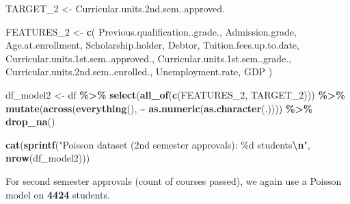 \documentclass[
]{article}
\newenvironment{Shaded}{\begin{snugshade}}{\end{snugshade}}
\newcommand{\FunctionTok}[1]{\textcolor[rgb]{0.13,0.29,0.53}{\textbf{#1}}}
\newcommand{\NormalTok}[1]{#1}
\newcommand{\OtherTok}[1]{\textcolor[rgb]{0.56,0.35,0.01}{#1}}
\newcommand{\SpecialCharTok}[1]{\textcolor[rgb]{0.81,0.36,0.00}{\textbf{#1}}}
\newcommand{\StringTok}[1]{\textcolor[rgb]{0.31,0.60,0.02}{#1}}
\begin{document}
\begin{Shaded}
\begin{Highlighting}[]
\NormalTok{TARGET\_2 }\OtherTok{\textless{}{-}} \StringTok{\textquotesingle{}Curricular.units.2nd.sem..approved.\textquotesingle{}}

\NormalTok{FEATURES\_2 }\OtherTok{\textless{}{-}} \FunctionTok{c}\NormalTok{(}
    \StringTok{\textquotesingle{}Previous.qualification..grade.\textquotesingle{}}\NormalTok{,}
    \StringTok{\textquotesingle{}Admission.grade\textquotesingle{}}\NormalTok{,}
    \StringTok{\textquotesingle{}Age.at.enrollment\textquotesingle{}}\NormalTok{,}
    \StringTok{\textquotesingle{}Scholarship.holder\textquotesingle{}}\NormalTok{,}
    \StringTok{\textquotesingle{}Debtor\textquotesingle{}}\NormalTok{,}
    \StringTok{\textquotesingle{}Tuition.fees.up.to.date\textquotesingle{}}\NormalTok{,}
    \StringTok{\textquotesingle{}Curricular.units.1st.sem..approved.\textquotesingle{}}\NormalTok{,}
    \StringTok{\textquotesingle{}Curricular.units.1st.sem..grade.\textquotesingle{}}\NormalTok{,}
    \StringTok{\textquotesingle{}Curricular.units.2nd.sem..enrolled.\textquotesingle{}}\NormalTok{,}
    \StringTok{\textquotesingle{}Unemployment.rate\textquotesingle{}}\NormalTok{,}
    \StringTok{\textquotesingle{}GDP\textquotesingle{}}
\NormalTok{)}

\NormalTok{df\_model2 }\OtherTok{\textless{}{-}}\NormalTok{ df }\SpecialCharTok{\%\textgreater{}\%}
    \FunctionTok{select}\NormalTok{(}\FunctionTok{all\_of}\NormalTok{(}\FunctionTok{c}\NormalTok{(FEATURES\_2, TARGET\_2))) }\SpecialCharTok{\%\textgreater{}\%}
    \FunctionTok{mutate}\NormalTok{(}\FunctionTok{across}\NormalTok{(}\FunctionTok{everything}\NormalTok{(), }\SpecialCharTok{\textasciitilde{}} \FunctionTok{as.numeric}\NormalTok{(}\FunctionTok{as.character}\NormalTok{(.)))) }\SpecialCharTok{\%\textgreater{}\%}
    \FunctionTok{drop\_na}\NormalTok{()}

\FunctionTok{cat}\NormalTok{(}\FunctionTok{sprintf}\NormalTok{(}\StringTok{"Poisson dataset (2nd semester approvals): \%d students}\SpecialCharTok{\textbackslash{}n}\StringTok{"}\NormalTok{, }\FunctionTok{nrow}\NormalTok{(df\_model2)))}
\end{Highlighting}
\end{Shaded}

For second semester approvals (count of courses passed), we again use a
Poisson model on \textbf{4424} students.
\end{document}
